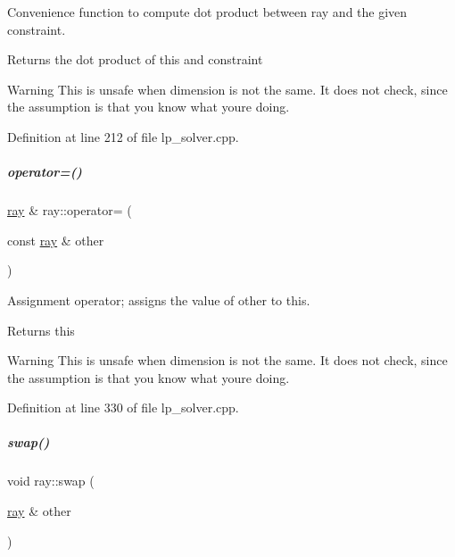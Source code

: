 Convenience function to compute dot product between ray and the given constraint. 

\begin{DoxyReturn}{Returns}
the dot product of {\ttfamily this} and {\ttfamily constraint} 
\end{DoxyReturn}
\begin{DoxyWarning}{Warning}
This is unsafe when dimension is not the same. It does not check, since the assumption is that you know what you\textquotesingle{}re doing. 
\end{DoxyWarning}


Definition at line 212 of file lp\+\_\+solver.\+cpp.

\mbox{\label{group___c_l_s_solvers_a83fa2d552fda75b973fe659c39ff9960}} 
\subparagraph{\texorpdfstring{operator=()}{operator=()}}
{\footnotesize\ttfamily \hyperlink{group___c_l_s_solvers_classray}{ray} \& ray\+::operator= (\begin{DoxyParamCaption}\item[{const \hyperlink{group___c_l_s_solvers_classray}{ray} \&}]{other }\end{DoxyParamCaption})}



Assignment operator; assigns the value of {\ttfamily other} to {\ttfamily this}. 

\begin{DoxyReturn}{Returns}
{\ttfamily this} 
\end{DoxyReturn}
\begin{DoxyWarning}{Warning}
This is unsafe when dimension is not the same. It does not check, since the assumption is that you know what you\textquotesingle{}re doing. 
\end{DoxyWarning}


Definition at line 330 of file lp\+\_\+solver.\+cpp.

\mbox{\label{group___c_l_s_solvers_a3f95b591c0b92d2ea8cc04b1c9b0d179}} 
\subparagraph{\texorpdfstring{swap()}{swap()}}
{\footnotesize\ttfamily void ray\+::swap (\begin{DoxyParamCaption}\item[{\hyperlink{group___c_l_s_solvers_classray}{ray} \&}]{other }\end{DoxyParamCaption})}



